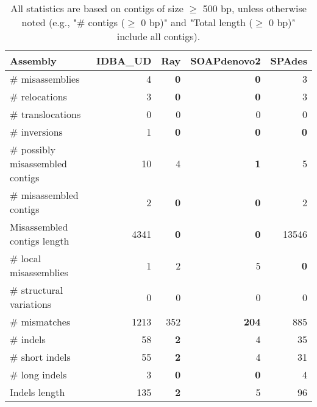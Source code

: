 \documentclass[12pt,a4paper]{article}
\begin{document}
\begin{table}[ht]
\begin{center}
\caption{All statistics are based on contigs of size $\geq$ 500 bp, unless otherwise noted (e.g., "\# contigs ($\geq$ 0 bp)" and "Total length ($\geq$ 0 bp)" include all contigs).}
\begin{tabular}{|l*{4}{|r}|}
\hline
Assembly & IDBA\_UD & Ray & SOAPdenovo2 & SPAdes \\ \hline
\# misassemblies & 4 & {\bf 0} & {\bf 0} & 3 \\ \hline
\hspace{5mm}\# relocations & 3 & {\bf 0} & {\bf 0} & 3 \\ \hline
\hspace{5mm}\# translocations & 0 & 0 & 0 & 0 \\ \hline
\hspace{5mm}\# inversions & 1 & {\bf 0} & {\bf 0} & {\bf 0} \\ \hline
\# possibly misassembled contigs & 10 & 4 & {\bf 1} & 5 \\ \hline
\# misassembled contigs & 2 & {\bf 0} & {\bf 0} & 2 \\ \hline
Misassembled contigs length & 4341 & {\bf 0} & {\bf 0} & 13546 \\ \hline
\# local misassemblies & 1 & 2 & 5 & {\bf 0} \\ \hline
\# structural variations & 0 & 0 & 0 & 0 \\ \hline
\# mismatches & 1213 & 352 & {\bf 204} & 885 \\ \hline
\# indels & 58 & {\bf 2} & 4 & 35 \\ \hline
\hspace{5mm}\# short indels & 55 & {\bf 2} & 4 & 31 \\ \hline
\hspace{5mm}\# long indels & 3 & {\bf 0} & {\bf 0} & 4 \\ \hline
Indels length & 135 & {\bf 2} & 5 & 96 \\ \hline
\end{tabular}
\end{center}
\end{table}
\end{document}
